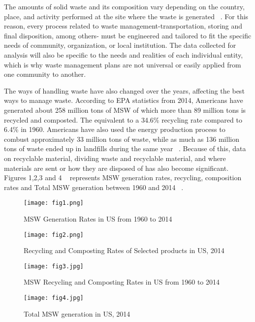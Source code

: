 \documentclass[sigconf]{acmart}
\begin{document}
The amounts of solid waste and its composition vary depending on the country, place, and activity performed at the site where the waste is generated ~\cite{chandrappa2012}. For this reason, every process related to waste management-transportation, storing and final disposition, among others- must be engineered and tailored to fit the specific needs of community, organization, or local institution.  The data collected for analysis will also be specific to the needs and realities of each individual entity, which is why waste management plans are not universal or easily applied from one community to another.  

The ways of handling waste have also changed over the years, affecting the best ways to manage waste. According to EPA statistics from 2014, Americans have generated about 258 million tons of MSW of which more than 89 million tons is recycled and composted. The equivalent to a 34.6\% recycling rate compared to 6.4\% in 1960. Americans have also used the energy production process to combust approximately 33 million tons of waste,  while as much as 136 million tons of waste ended up in landfills during the same year ~\cite{epa2014}.  Because of this, data on recyclable material, dividing waste and recyclable material, and where materials are sent or how they are disposed of has also become significant. Figures 1,2,3 and 4 ~\cite{epa2014} represents MSW generation rates, recycling, composition rates and Total MSW generation between 1960 and 2014 ~\cite{epa2014}.

\begin{figure}[ht!]
  \texttt{[image: fig1.png]}
  \caption{MSW Generation Rates in US from 1960 to 2014}
\end{figure}

\begin{figure}[ht!]
 \texttt{[image: fig2.png]}
 \caption{Recycling and Composting Rates of Selected products in US, 2014}
\end{figure}

\begin{figure}[ht!]
  \texttt{[image: fig3.jpg]}
  \caption{MSW Recycling and Composting Rates in US from 1960 to 2014}
\end{figure}

\begin{figure}[ht!]
  \texttt{[image: fig4.jpg]}
  \caption{Total MSW generation in US, 2014}
\end{figure} 
\end{document}
